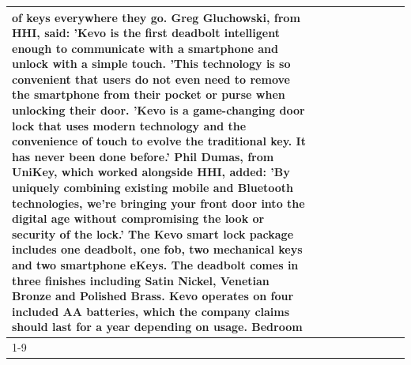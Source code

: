 \begin{table}[H]
\begin{tabular}{lllrlllll}
of keys everywhere they go. Greg Gluchowski, from HHI, said: 'Kevo is the first deadbolt intelligent enough to communicate with a smartphone and unlock with a simple touch. 'This technology is so convenient that users do not even need to remove the smartphone from their pocket or purse when unlocking their door. 'Kevo is a game-changing door lock that uses modern technology and the convenience of touch to evolve the traditional key. It has never been done before.' Phil Dumas, from UniKey, which worked alongside HHI, added: 'By uniquely combining existing mobile and Bluetooth technologies, we’re bringing your front door into the digital age without compromising the look or security of the lock.' The Kevo smart lock package includes one deadbolt, one fob, two mechanical keys and two smartphone eKeys. The deadbolt comes in three finishes including Satin Nickel, Venetian Bronze and Polished Brass. Kevo operates on four included AA batteries, which the company claims should last for a year depending on usage. Bedroom \\
\cline{1-9}
\bottomrule
\end{tabular}
\end{table}
